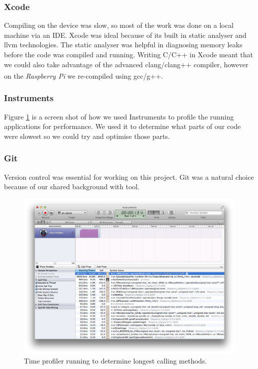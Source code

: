 \documentclass[11pt,a4paper,titlepage]{report}
\newcommand{\rpi}{\textit{Raspberry Pi\textsuperscript{\textregistered}}}
\begin{document}
\subsubsection{Xcode}

      Compiling on the device was slow, so most of the work was done on a local machine via an IDE. Xcode was ideal because of its built in static analyser and llvm technologies. The static analyser was helpful in diagnosing memory leaks before the code was compiled and running. Writing C/C++ in Xcode meant that we could also take advantage of the advanced clang/clang++ compiler, however on the \rpi\xspace we re-compiled using gcc/g++.

\subsubsection{Instruments}

      Figure \ref{fig:instruments} is a screen shot of how we used Instruments to profile the running applications for performance. We used it to determine what parts of our code were slowest so we could try and optimise those parts.
  
\subsubsection{Git}
      Version control was essential for working on this project. Git was a natural choice because of our shared background with tool.


\begin{figure}
\centering
\includegraphics[width=\textwidth]{graphs/instruments.png}
\caption{Time profiler running to determine longest calling methods.}
\label{fig:instruments}
\end{figure}
\end{document}
